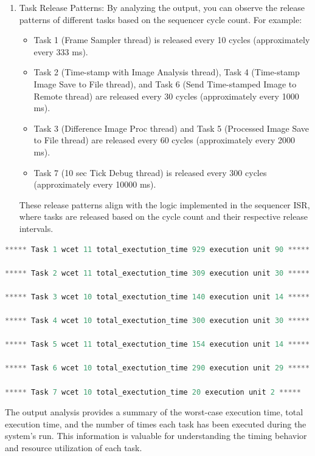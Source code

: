 \documentclass[a4paper,11pt]{article}%
\newenvironment{qanda}{\setlength{\parindent}{0pt}}{\bigskip}
\begin{document}
\begin{qanda}
\begin{enumerate}
\begin{enumerate}
				\item Task Release Patterns: By analyzing the output, you can observe the release patterns of different tasks based on the sequencer cycle count. For example:
				      \begin{itemize}
					      \item Task 1 (Frame Sampler thread) is released every 10 cycles (approximately every 333 ms).
					      \item Task 2 (Time-stamp with Image Analysis thread), Task 4 (Time-stamp Image Save to File thread), and Task 6 (Send Time-stamped Image to Remote thread) are released every 30 cycles (approximately every 1000 ms).
					      \item Task 3 (Difference Image Proc thread) and Task 5 (Processed Image Save to File thread) are released every 60 cycles (approximately every 2000 ms).
					      \item Task 7 (10 sec Tick Debug thread) is released every 300 cycles (approximately every 10000 ms).
				      \end{itemize}
				      These release patterns align with the logic implemented in the sequencer ISR, where tasks are released based on the cycle count and their respective release intervals.
			\end{enumerate}




			\begin{lstlisting}[language=C]
***** Task 1 wcet 11 total_exectution_time 929 execution unit 90 *****

***** Task 2 wcet 11 total_exectution_time 309 execution unit 30 *****

***** Task 3 wcet 10 total_exectution_time 140 execution unit 14 *****

***** Task 4 wcet 10 total_exectution_time 300 execution unit 30 *****

***** Task 5 wcet 11 total_exectution_time 154 execution unit 14 *****

***** Task 6 wcet 10 total_exectution_time 290 execution unit 29 *****

***** Task 7 wcet 10 total_exectution_time 20 execution unit 2 *****
			\end{lstlisting}

			The output analysis provides a summary of the worst-case execution time, total execution time, and the number of times each task has been executed during the system's run. This information is valuable for understanding the timing behavior and resource utilization of each task.\\



\end{enumerate}
\end{qanda}
\end{document}
